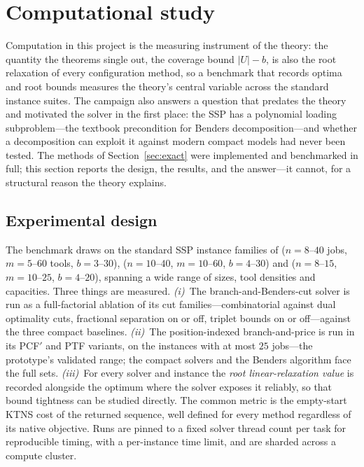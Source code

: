 \documentclass[11pt,a4paper]{article}
\theoremstyle{plain}
\theoremstyle{definition}
\theoremstyle{remark}
\newcommand{\U}{U}
\begin{document}
\section{Computational study}\label{sec:comp}
Computation in this project is the measuring instrument of the theory: the
quantity the theorems single out, the coverage bound $\lvert\U\rvert-b$, is also
the root relaxation of every configuration method, so a benchmark that records
optima and root bounds measures the theory's central variable across the
standard instance suites. The campaign also answers a question that predates the
theory and motivated the solver in the first place: the SSP has a polynomial
loading subproblem---the textbook precondition for Benders decomposition---and
whether a decomposition can exploit it against modern compact models had never
been tested. The methods of Section~\ref{sec:exact} were implemented and
benchmarked in full; this section reports the design, the results, and the
answer---it cannot, for a structural reason the theory explains.

\subsection{Experimental design}\label{ssec:bench}
The benchmark draws on the standard SSP instance families of \citet{Catanzaro2015}
($n=8$--$40$ jobs, $m=5$--$60$ tools, $b=3$--$30$), \citet{Crama1994}
($n=10$--$40$, $m=10$--$60$, $b=4$--$30$) and \citet{Laporte2004} ($n=8$--$15$,
$m=10$--$25$, $b=4$--$20$), spanning a wide range of sizes, tool densities and
capacities. Three things are measured. \emph{(i)}~The
branch-and-Benders-cut solver is run as a full-factorial ablation of its cut
families---combinatorial against dual optimality cuts, fractional separation on or
off, triplet bounds on or off---against the three compact baselines. \emph{(ii)}~The
position-indexed branch-and-price is run in its PCF$'$ and PTF variants, on the
instances with at most $25$ jobs---the prototype's validated range; the compact
solvers and the Benders algorithm face the full sets. \emph{(iii)}~For
every solver and instance the \emph{root linear-relaxation value} is recorded
alongside the optimum where the solver exposes it reliably, so that bound tightness
can be studied directly. The common metric is the empty-start KTNS cost of the
returned sequence, well defined for every method regardless of its native objective.
Runs are pinned to a fixed solver thread count per task for reproducible timing,
with a per-instance time limit, and are sharded across a compute cluster.
\end{document}
